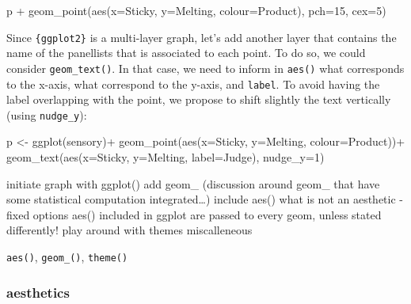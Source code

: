 \documentclass[
]{book}
\newenvironment{Shaded}{\begin{snugshade}}{\end{snugshade}}
\newcommand{\AttributeTok}[1]{\textcolor[rgb]{0.77,0.63,0.00}{#1}}
\newcommand{\DecValTok}[1]{\textcolor[rgb]{0.00,0.00,0.81}{#1}}
\newcommand{\FunctionTok}[1]{\textcolor[rgb]{0.00,0.00,0.00}{#1}}
\newcommand{\NormalTok}[1]{#1}
\newcommand{\OtherTok}[1]{\textcolor[rgb]{0.56,0.35,0.01}{#1}}
\newcommand{\SpecialCharTok}[1]{\textcolor[rgb]{0.00,0.00,0.00}{#1}}
\begin{document}
\begin{Shaded}
\begin{Highlighting}[]
\NormalTok{p }\SpecialCharTok{+} \FunctionTok{geom\_point}\NormalTok{(}\FunctionTok{aes}\NormalTok{(}\AttributeTok{x=}\NormalTok{Sticky, }\AttributeTok{y=}\NormalTok{Melting, }\AttributeTok{colour=}\NormalTok{Product), }\AttributeTok{pch=}\DecValTok{15}\NormalTok{, }\AttributeTok{cex=}\DecValTok{5}\NormalTok{)}
\end{Highlighting}
\end{Shaded}

Since \texttt{\{ggplot2\}} is a multi-layer graph, let's add another layer that contains the name of the panellists that is associated to each point. To do so, we could consider \texttt{geom\_text()}. In that case, we need to inform in \texttt{aes()} what corresponds to the x-axis, what correspond to the y-axis, and \texttt{label}. To avoid having the label overlapping with the point, we propose to shift slightly the text vertically (using \texttt{nudge\_y}):

\begin{Shaded}
\begin{Highlighting}[]
\NormalTok{p }\OtherTok{\textless{}{-}} \FunctionTok{ggplot}\NormalTok{(sensory)}\SpecialCharTok{+}
  \FunctionTok{geom\_point}\NormalTok{(}\FunctionTok{aes}\NormalTok{(}\AttributeTok{x=}\NormalTok{Sticky, }\AttributeTok{y=}\NormalTok{Melting, }\AttributeTok{colour=}\NormalTok{Product))}\SpecialCharTok{+}
  \FunctionTok{geom\_text}\NormalTok{(}\FunctionTok{aes}\NormalTok{(}\AttributeTok{x=}\NormalTok{Sticky, }\AttributeTok{y=}\NormalTok{Melting, }\AttributeTok{label=}\NormalTok{Judge), }\AttributeTok{nudge\_y=}\DecValTok{1}\NormalTok{)}
\end{Highlighting}
\end{Shaded}

initiate graph with ggplot()
add geom\_
(discussion around geom\_ that have some statistical computation integrated\ldots)
include aes()
what is not an aesthetic - fixed options
aes() included in ggplot are passed to every geom, unless stated differently!
play around with themes
miscalleneous

\texttt{aes()}, \texttt{geom\_()}, \texttt{theme()}

\hypertarget{aesthetics}{%
\subsubsection{aesthetics}\label{aesthetics}}
\end{document}
